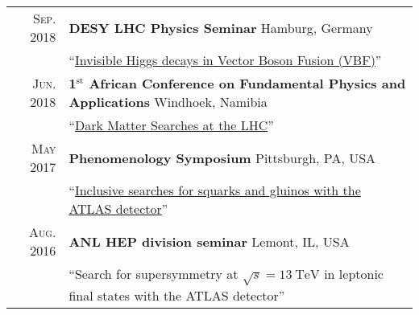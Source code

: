 \documentclass[a4paper,10pt]{article}
\begin{document}
\begin{tabular}{rp{15.5cm}}
\textsc{Sep. 2018}		& {\bf DESY LHC Physics Seminar} \hfill Hamburg, Germany\\
						& ``\href{https://indico.desy.de/indico/event/19964/}{Invisible Higgs decays in Vector Boson Fusion (VBF)}''  	\\
\textsc{Jun. 2018}		& {\bf 1$^{\mathrm{st}}$ African Conference on Fundamental Physics and Applications} \hfill Windhoek, Namibia \\
						& ``\href{https://cds.cern.ch/record/2624806}{Dark Matter Searches at the LHC}''  	\\
\textsc{May 2017}		& {\bf Phenomenology Symposium} \hfill Pittsburgh, PA, USA \\
						& ``\href{https://cds.cern.ch/record/2264385}{Inclusive searches for squarks and gluinos with the ATLAS detector}'' \\
\textsc{Aug. 2016}		& {\bf ANL HEP division seminar} \hfill Lemont, IL, USA \\
						& ``Search for supersymmetry at $\sqrt{s} = 13\ \mathrm{TeV}$ in leptonic final states with the ATLAS detector'' \\


\end{tabular}
\end{document}
